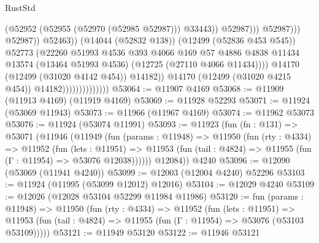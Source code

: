 \begin{lexlean}{RustStd}
\begin{coremodule}
                                                            (@52952
                                                              (@52955 (@52970 (@52985 @52987)))
                                                              @33443))
                                                          @52987)))
                                                    @52987)))
                                              @52987))
                                          @52463))
                                      (@14044 (@52832 @138))
                                      (@12499 (@52836 @453 @545))
                                      @52773
                                      (@22260
                                        @51993
                                        @4536
                                        @393
                                        @4066
                                        @169
                                        @57
                                        @4886
                                        @4838
                                        @11434
                                        @13574
                                        (@13464 @51993 @4536)
                                        (@12725 (@27110 @4066 @11434))))
                                    @14170
                                    (@12499 (@31020 @4142 @454))
                                    @14182))
                                @14170
                                (@12499 (@31020 @4215 @454))
                                @14182))))))))))))))
@53064 := @11907 @4169
@53068 := @11909 (@11913 @4169) (@11919 @4169)
@53069 := @11928 @52293
@53071 := @11924 (@53069 @11943)
@53073 := @11966 (@11967 @4169)
@53074 := @11962 @53073
@53076 := @11924 (@53074 @11991)
@53093 := @11923
    (fun (fn : @131) =>
    @53071
      (@11946
        (@11949
          (fun (params : @11948) =>
          @11950
            (fun (rty : @4334) =>
            @11952
              (fun (lets : @11951) =>
              @11953 (fun (tail : @4824) => @11955 (fun (Γ : @11954) => @53076 @12038))))))
        @12084))
    @4240
@53096 := @12090 (@53069 (@11941 @4240))
@53099 := @12003 (@12004 @4240) @52296
@53103 := @11924 (@11995 (@53099 @12012) @12016)
@53104 := @12029 @4240
@53109 := @12026 (@12028 @53104 @52299 @11984 @11986)
@53120 := fun (params : @11948) =>
  @11950
    (fun (rty : @4334) =>
    @11952
      (fun (lets : @11951) =>
      @11953 (fun (tail : @4824) => @11955 (fun (Γ : @11954) => @53076 (@53103 @53109)))))
@53121 := @11949 @53120
@53122 := @11946 @53121

\end{coremodule}
\end{lexlean}
